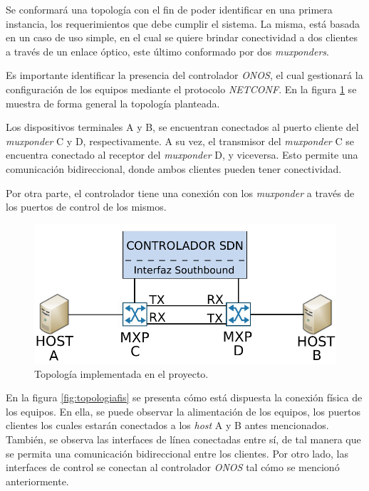 Se conformará una topología con el fin de poder identificar en una primera instancia, los requerimientos que debe cumplir el sistema. La misma, está basada en un caso de uso simple, en el cual se quiere brindar conectividad a dos clientes a través de un enlace óptico, este último conformado por dos \textit{muxponders}.  

Es importante identificar la presencia del controlador \textit{ONOS}, el cual gestionará la configuración de los equipos mediante el protocolo \textit{NETCONF}. En la figura \ref{fig:topologia} se muestra de forma general la topología planteada. 

Los dispositivos terminales A y B, se encuentran conectados al puerto cliente del \textit{muxponder} C y D, respectivamente. A su vez, el transmisor del \textit{muxponder} C se encuentra conectado al receptor del \textit{muxponder} D, y viceversa. Esto permite una comunicación bidireccional, donde ambos clientes pueden tener conectividad. 

Por otra parte, el controlador tiene una conexión con los \textit{muxponder} a través de los puertos de control de los mismos. 

\begin{figure}[H]
    \centering
    \includegraphics[scale=0.68]{Figures/topologia.pdf}
    \caption{Topología implementada en el proyecto.}
    \label{fig:topologia}
  \end{figure}


En la figura \ref{fig:topologiafis} se presenta cómo está dispuesta la conexión física de los equipos. En ella, se puede observar la alimentación de los equipos, los puertos clientes los cuales estarán conectados a los \textit{host} A y B antes mencionados. También, se observa las interfaces de línea conectadas entre sí, de tal manera que se permita una comunicación bidireccional entre los clientes. Por otro lado, las interfaces de control se conectan al controlador \textit{ONOS} tal cómo se mencionó anteriormente. 

